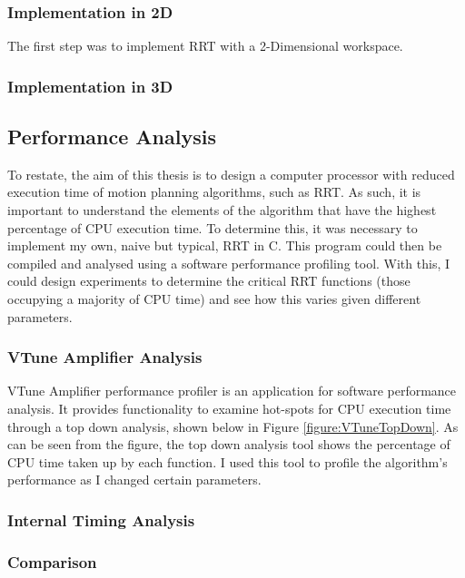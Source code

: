     \subsubsection{Implementation in 2D}
    The first step was to implement RRT with a 2-Dimensional workspace. 
    

    \subsubsection{Implementation in 3D}
    

    


\subsection{Performance Analysis}
    To restate, the aim of this thesis is to design a computer processor with reduced execution time of motion planning algorithms, such as \ac{RRT}. As such, it is important to understand the elements of the algorithm that have the highest percentage of CPU execution time. To determine this, it was necessary to implement my own, naive but typical, \ac{RRT} in C. This program could then be compiled and analysed using a software performance profiling tool. With this, I could design experiments to determine the critical RRT functions (those occupying a majority of CPU time) and see how this varies given different parameters.

    \subsubsection{VTune Amplifier Analysis}
    \label{subsubsection:vtune}
        VTune Amplifier performance profiler is an application for software performance analysis. It provides functionality to examine hot-spots for CPU execution time through a top down analysis, shown below in Figure \ref{figure:VTuneTopDown}. As can be seen from the figure, the top down analysis tool shows the percentage of CPU time taken up by each function. I used this tool to profile the algorithm's performance as I changed certain parameters.
        

    \subsubsection{Internal Timing Analysis}

    \subsubsection{Comparison}